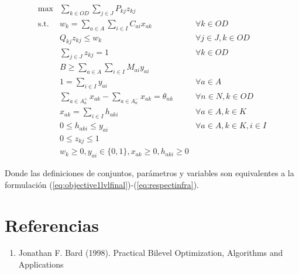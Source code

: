 \documentclass{article}
\begin{document}
  \begin{align}
    \text{max}    & \sum_{k \in OD} \sum_{j \in J} P_{kj} z_{kj}                                           & \label{eq:objectivealtfinal} \\
    \text{s.t.}\; & w_k = \sum_{a \in A} \sum_{i \in I} C_{ai}x_{ak}                                       & \forall k \in OD \label{eq:shortestpathaltfinal} \\
                  & Q_{kj} z_{kj} \leq w_k                                                                 & \forall j \in J, k \in OD \label{eq:breakpointsalt} \\
                  & \sum_{j \in J} z_{kj} = 1                                                              & \forall k \in OD \label{eq:singularbreakpointalt} \\
                  & B \geq \sum_{a \in A} \sum_{i \in I} M_{ai}y_{ai}                                      & \label{eq:respectbudgetaltfinal} \\
                  & 1 = \sum_{i \in I} y_{ai}                                                              & \forall a \in A \label{eq:alwaysoneyaltfinal} \\
                  & \sum_{a \in A_n^+} x_{ak} - \sum_{a \in A_n^-} x_{ak} = \theta_{nk}                    & \forall n \in N, k \in OD \label{eq:flowbalancealt} \\
                  & x_{ak} = \sum_{i \in I} h_{aki}                                            & \forall a \in A, k \in K \label{eq:flowactivationalt} \\
                  & 0 \leq h_{aki} \leq y_{ai}                                                 & \forall a \in A, k \in K, i \in I \label{eq:respectinfraalt} \\
                  & 0 \leq z_{kj} \leq 1                                                                   & \nonumber \\
                  & w_k \geq 0, y_{ai} \in \{ 0, 1 \}, x_{ak} \geq 0, h_{aki} \geq 0                       & \nonumber
  \end{align}

  Donde las definiciones de conjuntos, parámetros y variables son equivalentes a la formulación (\ref{eq:objective1lvlfinal})-(\ref{eq:respectinfra}).

  \section*{Referencias}

  \begin{enumerate}
    \item{\label{bardbook} Jonathan F. Bard (1998). Practical Bilevel Optimization, Algorithms and Applications}
  \end{enumerate}
\end{document}
